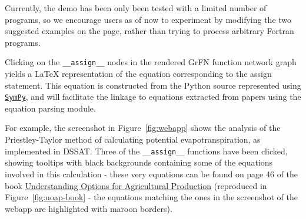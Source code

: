 \documentclass[article, 12pt, oneside]{memoir}
\begin{document}
Currently, the demo has been only been tested with a limited number of
programs, so we encourage users as of now to experiment by modifying the
two suggested examples on the page, rather than trying to process
arbitrary Fortran programs.

Clicking on the \texttt{\_\_assign\_\_} nodes in the rendered GrFN
function network graph yields a LaTeX representation of the equation
corresponding to the assign statement. This equation is constructed from
the Python source represented using
\href{https://www.sympy.org}{\texttt{SymPy}}, and will facilitate the
linkage to equations extracted from papers using the equation parsing
module.

For example, the screenshot in Figure~\ref{fig:webapp} shows the analysis of the
Priestley-Taylor method of calculating potential evapotranspiration, as
implemented in DSSAT. Three of the \texttt{\_\_assign\_\_} functions
have been clicked, showing tooltips with black backgrounds containing
some of the equations involved in this calculation - these very
equations can be found on page 46 of the book
\href{https://link-springer-com.ezproxy2.library.arizona.edu/book/10.1007\%2F978-94-017-3624-4}{Understanding
Options for Agricultural Production} (reproduced in Figure~\ref{fig:uoap-book} - the equations
matching the ones in the screenshot of the webapp are highlighted with
maroon borders).

\end{document}
